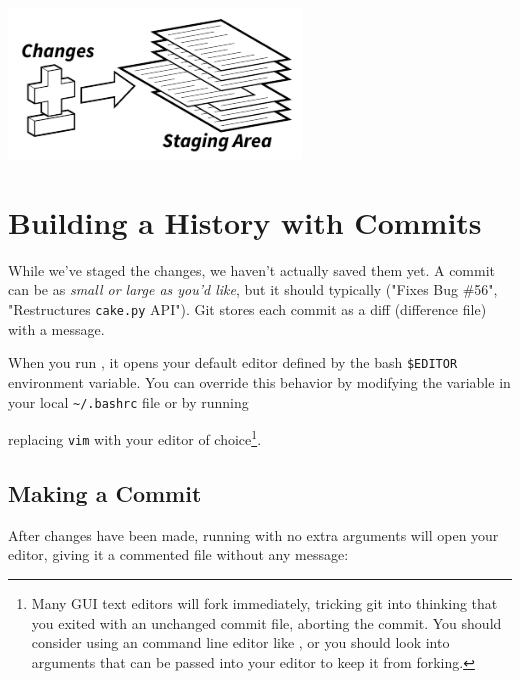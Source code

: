 \documentclass[11pt,letterpaper,twoside]{report}
\begin{document}
\vspace{\fill}
\begin{flushright}
\includegraphics[height=4cm]{resources/staging_abstract.pdf}

\end{flushright}
\vspace*{\fill}

\chapter{Building a History with Commits}

While we've staged the changes, we haven't actually saved them yet. A commit can
be as \emph{small or large as you'd like}, but it should typically
 ("Fixes Bug \#56", "Restructures
\texttt{cake.py} API"). \cite{git-branch-example} Git stores each commit as a
diff (difference file) with a message.

When you run , it opens your default editor defined by the
bash \texttt{\$EDITOR} environment variable. You can override this behavior by
modifying the variable in your local \texttt{\textasciitilde/.bashrc} file or by
running


replacing \texttt{vim}
with your editor of choice\footnote{Many GUI text editors will fork immediately,
tricking git into thinking that you exited with an unchanged commit file,
aborting the commit. You should consider using an command line editor like
, or you should look into arguments that can be passed into your
editor to keep it from forking.}.

\section{Making a Commit}

After changes have been made, running  with no extra arguments
will open your editor, giving it a commented file without any message:
\end{document}

